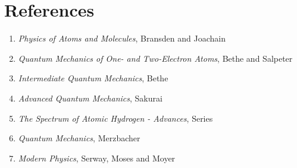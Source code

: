 \documentclass[a4paper]{IEEEtran}
\begin{document}
    \section{References}
    \begin{enumerate}
        \item \emph{Physics of Atoms and Molecules}, Bransden and Joachain
        \item \emph{Quantum Mechanics of One- and Two-Electron Atoms},
                    Bethe and Salpeter
        \item \emph{Intermediate Quantum Mechanics}, Bethe
        \item \emph{Advanced Quantum Mechanics}, Sakurai
        \item \emph{The Spectrum of Atomic Hydrogen - Advances}, Series
        \item \emph{Quantum Mechanics}, Merzbacher
        \item \emph{Modern Physics}, Serway, Moses and Moyer
    \end{enumerate}

\end{document}
